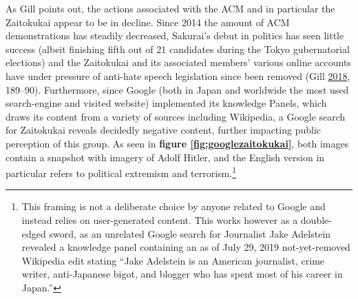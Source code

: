 \documentclass[10pt,british,A4paper,,openany]{memoir}
\begin{document}
As Gill points out, the actions associated with the ACM and in
particular the Zaitokukai appear to be in decline. Since 2014 the amount
of ACM demonstrations has steadily decreased, Sakurai's debut in
politics has seen little success (albeit finishing fifth out of 21
candidates during the Tokyo gubernatorial elections) and the Zaitokukai
and its associated members' various online accounts have under pressure
of anti-hate speech legislation since been removed (Gill
\protect\hyperlink{ref-gill_nativist_2018}{2018}, 189--90). Furthermore,
since Google (both in Japan and worldwide the most used search-engine
and visited website) implemented its knowledge Panels, which draws its
content from a variety of sources including Wikipedia, a Google search
for Zaitokukai reveals decidedly negative content, further impacting
public perception of this group. As seen in \textbf{figure
\ref{fig:googlezaitokukai}}, both images contain a snapshot with imagery
of Adolf Hitler, and the English version in particular refers to
political extremism and terrorism.\footnote{This framing is not a
  deliberate choice by anyone related to Google and instead relies on
  user-generated content. This works however as a double-edged sword, as
  an unrelated Google search for Journalist Jake Adelstein revealed a
  knowledge panel containing an as of July 29, 2019 not-yet-removed
  Wikipedia edit stating ``Jake Adelstein is an American journalist,
  crime writer, anti-Japanese bigot, and blogger who has spent most of
  his career in Japan.''}
\end{document}
